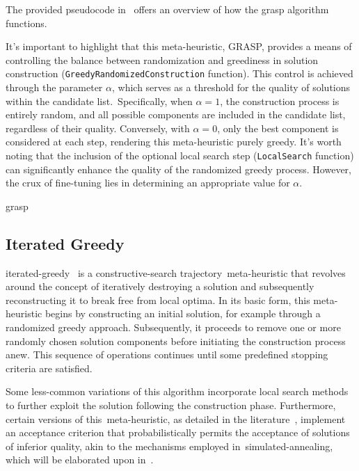 The provided pseudocode in~ offers an overview of how the
\acrshort{grasp} algorithm functions.

It's important to highlight that this meta-heuristic, GRASP, provides a means of
controlling the balance between randomization and greediness in solution
construction (\texttt{GreedyRandomizedConstruction} function). This control is
achieved through the parameter $\alpha$, which serves as a threshold for the
quality of solutions within the candidate list.~Specifically, when $\alpha = 1$,
the construction process is entirely random, and all possible components are
included in the candidate list, regardless of their quality. Conversely, with
$\alpha = 0$, only the best component is considered at each step, rendering this
\acrshort{meta-heuristic} purely greedy. It's worth noting that the inclusion of
the optional local search step (\texttt{LocalSearch} function) can significantly
enhance the quality of the randomized greedy process. However, the crux of
fine-tuning lies in determining an appropriate value for $\alpha$.

\begin{algorithm}
  
  \caption{\acrlong{grasp}}
  \label{algorithm:grasp}
\end{algorithm}

\subsection{Iterated Greedy}
\label{subsec:iterated-greedy}

\acrfull{iterated-greedy}~\cite{stutzle2018iterated,outeiro2021application} is a
\acrshort{constructive-search} trajectory~\acrshort{meta-heuristic} that
revolves around the concept of iteratively destroying a solution and
subsequently reconstructing it to break free from local optima. In its basic
form, this \acrshort{meta-heuristic} begins by constructing an initial solution,
for example through a randomized greedy approach. Subsequently, it proceeds to
remove one or more randomly chosen solution components before initiating the
construction process anew. This sequence of operations continues until some
predefined stopping criteria are satisfied.

Some less-common variations of this algorithm incorporate local search methods
to further exploit the solution following the construction phase. Furthermore,
certain versions of this~\acrshort{meta-heuristic}, as detailed in the
literature~\cite{stutzle2018iterated}, implement an acceptance criterion that
probabilistically permits the acceptance of solutions of inferior quality, akin
to the mechanisms employed in~\acrshort{simulated-annealing}, which will be
elaborated upon in~.

